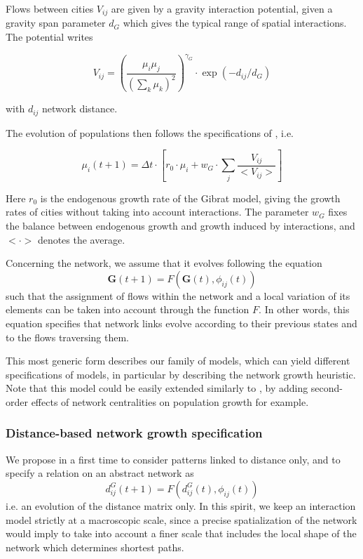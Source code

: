 \documentclass[11pt]{article}
\begin{document}
Flows between cities $V_{ij}$ are given by a gravity interaction potential, given a gravity span parameter $d_G$ which gives the typical range of spatial interactions. The potential writes

\begin{equation}
V_{ij} = \left(\frac{\mu_i\mu_j}{\left(\sum_k{\mu_k}\right)^2}\right)^{\gamma_G}\cdot \exp{\left(-d_{ij}/d_G\right)}
\end{equation}

with $d_{ij}$ network distance.


The evolution of populations then follows the specifications of \cite{raimbault2018indirect}, i.e.

\begin{equation}
\mu_i(t+1)=\Delta t\cdot \left[ r_0\cdot \mu_i + w_G\cdot \sum_j \frac{V_{ij}}{<V_{ij}>}\right]
\end{equation}

Here $r_0$ is the endogenous growth rate of the Gibrat model, giving the growth rates of cities without taking into account interactions. The parameter $w_G$ fixes the balance between endogenous growth and growth induced by interactions, and $< \cdot >$ denotes the average.

Concerning the network, we assume that it evolves following the equation
\begin{equation}
\mathbf{G}(t + 1) = F(\mathbf{G}(t),\phi_{ij}(t))
\end{equation}
such that the assignment of flows within the network and a local variation of its elements can be taken into account through the function $F$. In other words, this equation specifies that network links evolve according to their previous states and to the flows traversing them.

This most generic form describes our family of models, which can yield different specifications of models, in particular by describing the network growth heuristic. Note that this model could be easily extended similarly to \cite{raimbault2018indirect}, by adding second-order effects of network centralities on population growth for example.

\subsubsection{Distance-based network growth specification}

We propose in a first time to consider patterns linked to distance only, and to specify a relation on an abstract network as
\begin{equation}
d^G_{ij}(t+1) = F(d^G_{ij}(t),\phi_{ij}(t))
\end{equation}
i.e. an evolution of the distance matrix only. In this spirit, we keep an interaction model strictly at a macroscopic scale, since a precise spatialization of the network would imply to take into account a finer scale that includes the local shape of the network which determines shortest paths.
\end{document}
